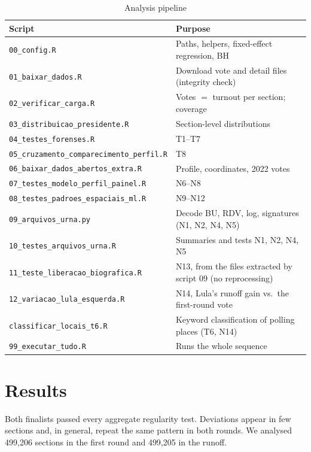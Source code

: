 \documentclass[fleqn,10pt]{SelfArx}
\begin{document}
\begin{table}[ht]
\caption{Analysis pipeline}
\label{tab:pipeline}
\centering\scriptsize
\begin{tabular}{@{}L{5.6cm} L{9.5cm}@{}}
\toprule
\textbf{Script} & \textbf{Purpose} \\
\midrule
\texttt{00\_config.R} & Paths, helpers, fixed-effect regression, BH \\
\texttt{01\_baixar\_dados.R} & Download vote and detail files (integrity check) \\
\texttt{02\_verificar\_carga.R} & Votes $=$ turnout per section; coverage \\
\texttt{03\_distribuicao\_presidente.R} & Section-level distributions \\
\texttt{04\_testes\_forenses.R} & T1--T7 \\
\texttt{05\_cruzamento\_comparecimento\_perfil.R} & T8 \\
\texttt{06\_baixar\_dados\_abertos\_extra.R} & Profile, coordinates, 2022 votes \\
\texttt{07\_testes\_modelo\_perfil\_painel.R} & N6--N8 \\
\texttt{08\_testes\_padroes\_espaciais\_ml.R} & N9--N12 \\
\texttt{09\_arquivos\_urna.py} & Decode BU, RDV, log, signatures (N1, N2, N4, N5) \\
\texttt{10\_testes\_arquivos\_urna.R} & Summaries and tests N1, N2, N4, N5 \\
\texttt{11\_teste\_liberacao\_biografica.R} & N13, from the files extracted by script 09 (no reprocessing) \\
\texttt{12\_variacao\_lula\_esquerda.R} & N14, Lula's runoff gain vs.\ the first-round vote \\
\texttt{classificar\_locais\_t6.R} & Keyword classification of polling places (T6, N14) \\
\texttt{99\_executar\_tudo.R} & Runs the whole sequence \\
\bottomrule
\end{tabular}
\end{table}

\section{Results}
\label{sec:results}

Both finalists passed every aggregate regularity test. Deviations appear in
few sections and, in general, repeat the same pattern in both rounds. We
analysed 499,206 sections in the first round and 499,205 in the runoff.
\end{document}
